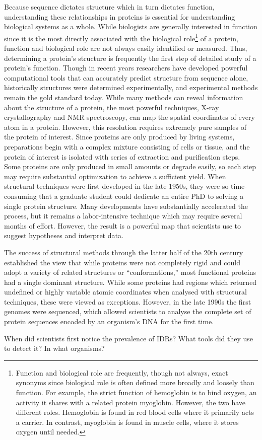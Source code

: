 Because sequence dictates structure which in turn dictates function, understanding these relationships in proteins is essential for understanding biological systems as a whole. While biologists are generally interested in function since it is the most directly associated with the biological role\footnote{Function and biological role are frequently, though not always, exact synonyms since biological role is often defined more broadly and loosely than function. For example, the strict function of hemoglobin is to bind oxygen, an activity it shares with a related protein myoglobin. However, the two have different roles. Hemoglobin is found in red blood cells where it primarily acts a carrier. In contrast, myoglobin is found in muscle cells, where it stores oxygen until needed.} of a protein, function and biological role are not always easily identified or measured. Thus, determining a protein's structure is frequently the first step of detailed study of a protein's function. Though in recent years researchers have developed powerful computational tools that can accurately predict structure from sequence alone, historically structures were determined experimentally, and experimental methods remain the gold standard today. While many methods can reveal information about the structure of a protein, the most powerful techniques, X-ray crystallography and NMR spectroscopy, can map the spatial coordinates of every atom in a protein. However, this resolution requires extremely pure samples of the protein of interest. Since proteins are only produced by living systems, preparations begin with a complex mixture consisting of cells or tissue, and the protein of interest is isolated with series of extraction and purification steps. Some proteins are only produced in small amounts or degrade easily, so each step may require substantial optimization to achieve a sufficient yield. When structural techniques were first developed in the late 1950s, they were so time-consuming that a graduate student could dedicate an entire PhD to solving a single protein structure. Many developments have substantially accelerated the process, but it remains a labor-intensive technique which may require several months of effort. However, the result is a powerful map that scientists use to suggest hypotheses and interpret data.

The success of structural methods through the latter half of the 20th century established the view that while proteins were not completely rigid and could adopt a variety of related structures or ``conformations,'' most functional proteins had a single dominant structure. While some proteins had regions which returned undefined or highly variable atomic coordinates when analysed with structural techniques, these were viewed as exceptions. However, in the late 1990s the first genomes were sequenced, which allowed scientists to analyse the complete set of protein sequences encoded by an organism's DNA for the first time.

When did scientists first notice the prevalence of IDRs?
What tools did they use to detect it?
In what organisms?